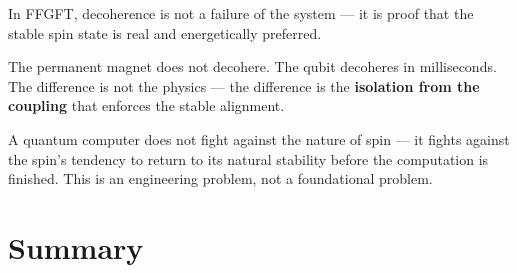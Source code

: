 \begin{keypoint}
In FFGFT, decoherence is not a failure of the system ---
it is proof that the stable spin state is real and
energetically preferred.

The permanent magnet does not decohere.
The qubit decoheres in milliseconds.
The difference is not the physics ---
the difference is the \textbf{isolation from the coupling}
that enforces the stable alignment.

A quantum computer does not fight against the nature of spin ---
it fights against the spin's tendency to return to its natural
stability before the computation is finished.
This is an engineering problem, not a foundational problem.
\end{keypoint}

\section{Summary}
\label{sec:summary-178}

